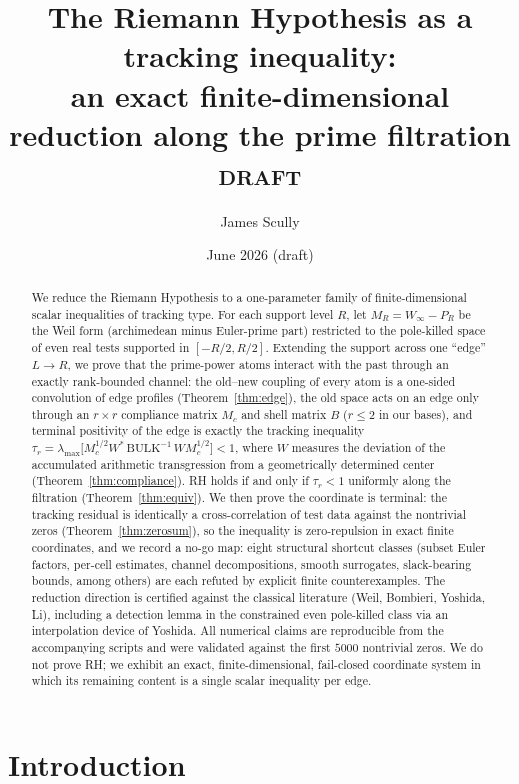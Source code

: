 \documentclass[11pt,reqno]{amsart}
\title[RH as a tracking inequality]{The Riemann Hypothesis as a tracking inequality:\\
an exact finite-dimensional reduction along the prime filtration\\
{\normalsize\textsc{draft}}}
\author{James Scully}
\date{June 2026 (draft)}
\theoremstyle{plain}
\theoremstyle{definition}
\theoremstyle{remark}
\begin{document}
\begin{abstract}
We reduce the Riemann Hypothesis to a one-parameter family of finite-dimensional scalar
inequalities of tracking type. For each support level $R$, let $M_R = W_\infty - P_R$ be the
Weil form (archimedean minus Euler-prime part) restricted to the pole-killed space of even
real tests supported in $[-R/2,R/2]$. Extending the support across one ``edge'' $L \to R$, we
prove that the prime-power atoms interact with the past through an exactly rank-bounded
channel: the old--new coupling of every atom is a one-sided convolution of edge profiles
(Theorem~\ref{thm:edge}), the old space acts on an edge only through an $r\times r$
compliance matrix $M_c$ and shell matrix $B$ ($r \le 2$ in our bases), and terminal
positivity of the edge is exactly the tracking inequality
$\tau_r = \lambda_{\max}\!\big[M_c^{1/2} W^{*}\,\mathrm{BULK}^{-1}\,W M_c^{1/2}\big] < 1$,
where $W$ measures the deviation of the accumulated arithmetic transgression from a
geometrically determined center (Theorem~\ref{thm:compliance}). RH holds if and only if
$\tau_r < 1$ uniformly along the filtration (Theorem~\ref{thm:equiv}). We then prove the
coordinate is terminal: the tracking residual is identically a cross-correlation of test
data against the nontrivial zeros (Theorem~\ref{thm:zerosum}), so the inequality is
zero-repulsion in exact finite coordinates, and we record a no-go map: eight structural
shortcut classes (subset Euler factors, per-cell estimates, channel decompositions, smooth
surrogates, slack-bearing bounds, among others) are each refuted by explicit finite
counterexamples. The reduction direction is certified against the classical literature
(Weil, Bombieri, Yoshida, Li), including a detection lemma in the constrained even
pole-killed class via an interpolation device of Yoshida. All numerical claims are
reproducible from the accompanying scripts and were validated against the first $5000$
nontrivial zeros. We do not prove RH; we exhibit an exact, finite-dimensional, fail-closed
coordinate system in which its remaining content is a single scalar inequality per edge.
\end{abstract}

\maketitle

\section{Introduction}
\end{document}
